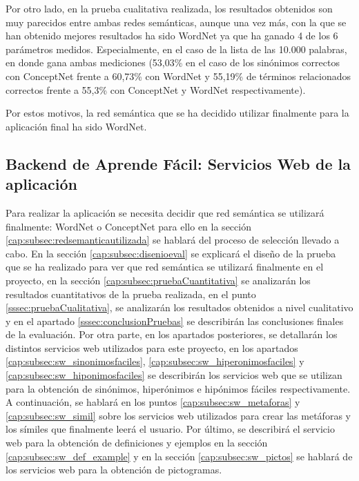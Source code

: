 Por otro lado, en la prueba cualitativa realizada, los resultados obtenidos son muy parecidos entre ambas redes semánticas, aunque una vez más, con la que se han obtenido mejores resultados ha sido WordNet ya que ha ganado 4 de los 6 parámetros medidos. Especialmente, en el caso de la lista de las 10.000 palabras, en donde gana ambas mediciones (53,03\% en el caso de los sinónimos correctos con ConceptNet frente a 60,73\% con WordNet y 55,19\% de términos relacionados correctos frente a 55,3\% con ConceptNet y WordNet respectivamente).

Por estos motivos, la red semántica que se ha decidido utilizar finalmente para la aplicación final ha sido WordNet.


\subsection{Backend de Aprende Fácil: Servicios Web de la aplicación}
\label{cap:subsec:backendapp}
Para realizar la aplicación se necesita decidir que red semántica se utilizará finalmente: WordNet o ConceptNet para ello en la sección \ref{cap:subsec:redsemanticautilizada} se hablará del proceso de selección llevado a cabo. En la sección \ref{cap:subsec:disenioeval} se explicará el diseño de la prueba que se ha realizado para ver que red semántica se utilizará finalmente en el proyecto, en la sección \ref{cap:subsec:pruebaCuantitativa} se analizarán los resultados cuantitativos de la prueba realizada, en el punto \ref{sssec:pruebaCualitativa}, se analizarán los resultados obtenidos a nivel cualitativo y en el apartado \ref{sssec:conclusionPruebas} se describirán las conclusiones finales de la evaluación. Por otra parte, en los apartados posteriores, se detallarán los distintos servicios web utilizados para este proyecto, en los apartados \ref{cap:subsec:sw_sinonimosfaciles}, \ref{cap:subsec:sw_hiperonimosfaciles} y \ref{cap:subsec:sw_hiponimosfaciles} se describirán los servicios web que se utilizan para la obtención de sinónimos, hiperónimos e hipónimos fáciles respectivamente. A continuación, se hablará en los puntos \ref{cap:subsec:sw_metaforas} y \ref{cap:subsec:sw_simil} sobre los servicios web utilizados para crear las metáforas y los símiles que finalmente leerá el usuario. Por último, se describirá el servicio web para la obtención de definiciones y ejemplos en la sección \ref{cap:subsec:sw_def_example} y en la sección \ref{cap:subsec:sw_pictos} se hablará de los servicios web para la obtención de pictogramas.



